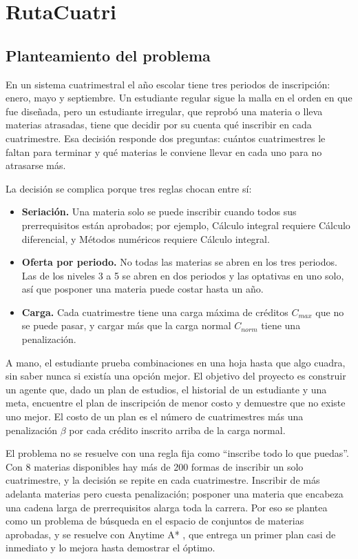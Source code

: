\chapter{RutaCuatri}
\section{Planteamiento del problema}
En un sistema cuatrimestral el año escolar tiene tres periodos de inscripción: enero, mayo y septiembre. Un estudiante regular sigue la malla en el orden en que fue diseñada, pero un estudiante irregular, que reprobó una materia o lleva materias atrasadas, tiene que decidir por su cuenta qué inscribir en cada cuatrimestre. Esa decisión responde dos preguntas: cuántos cuatrimestres le faltan para terminar y qué materias le conviene llevar en cada uno para no atrasarse más.

La decisión se complica porque tres reglas chocan entre sí:
\begin{itemize}
    \item \textbf{Seriación.} Una materia solo se puede inscribir cuando todos sus prerrequisitos están aprobados; por ejemplo, Cálculo integral requiere Cálculo diferencial, y Métodos numéricos requiere Cálculo integral.
    \item \textbf{Oferta por periodo.} No todas las materias se abren en los tres periodos. Las de los niveles 3 a 5 se abren en dos periodos y las optativas en uno solo, así que posponer una materia puede costar hasta un año.
    \item \textbf{Carga.} Cada cuatrimestre tiene una carga máxima de créditos $C_{max}$ que no se puede pasar, y cargar más que la carga normal $C_{norm}$ tiene una penalización.
\end{itemize}

A mano, el estudiante prueba combinaciones en una hoja hasta que algo cuadra, sin saber nunca si existía una opción mejor. El objetivo del proyecto es construir un agente que, dado un plan de estudios, el historial de un estudiante y una meta, encuentre el plan de inscripción de menor costo y demuestre que no existe uno mejor. El costo de un plan es el número de cuatrimestres más una penalización $\beta$ por cada crédito inscrito arriba de la carga normal.

El problema no se resuelve con una regla fija como ``inscribe todo lo que puedas''. Con 8 materias disponibles hay más de 200 formas de inscribir un solo cuatrimestre, y la decisión se repite en cada cuatrimestre. Inscribir de más adelanta materias pero cuesta penalización; posponer una materia que encabeza una cadena larga de prerrequisitos alarga toda la carrera. Por eso se plantea como un problema de búsqueda en el espacio de conjuntos de materias aprobadas, y se resuelve con Anytime A* \cite{hansen2007}, que entrega un primer plan casi de inmediato y lo mejora hasta demostrar el óptimo.

